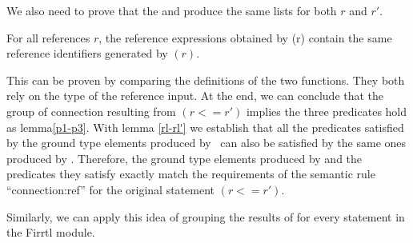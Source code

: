 {We also need to prove that the {\expandref} and {\listgexp} produce the same lists for both $r$ and $r'$.
\begin{lemma}\label{rl-rl'}
For all references $r$, the reference expressions obtained by \expandref(r) contain the same reference identifiers generated by \listgexp$(r)$.
\end{lemma}
This can be proven by comparing the definitions of the two functions. They both rely on the type of the reference input.
At the end, we can conclude that the group of connection resulting from \expandconnects $(r<=r')$ implies the three predicates hold as lemma\ref{p1-p3}. With lemma \ref{rl-rl'} we establish that all the predicates satisfied by the ground type elements produced by \expandref\, can also be satisfied by the same ones produced by \listgexp. Therefore, the ground type elements produced by \listgexp and the predicates they satisfy exactly match the requirements of the semantic rule ``connection:ref''
for the original statement $(r<=r')$.

Similarly, we can apply this idea of grouping the results of
{\expandconnects} for every statement in the Firrtl module.
}




